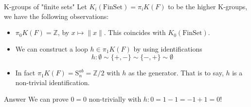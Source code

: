 \documentclass[12pt]{beamer}
\begin{document}
\begin{frame}{K-groups of "finite sets"}
  Let $ K_i(\mathrm{FinSet})= \pi_i K(F)$ to be the higher K-groups, we have the following observations:
  \pause
  \begin{itemize}
    \item $\pi_0 K(F) = \mathbb{Z}$, by $ x \mapsto \|x\|$. This coincides with $K_0(\mathrm{FinSet})$. 
      \pause
    \item We can construct a loop $h \in \pi_1 K(F) $ by using identifications 
      \[
        h: \emptyset \sim \{+,-\} \sim \{-,+\} \sim \emptyset
      \]
      \pause
    \item In fact $\pi_1 K(F)= \mathrm{S}_n^{ab}=\mathbb{Z}/2 $ with $h$ as the generator. That is to say, $h$ is a non-trivial identification. 
  \end{itemize}
  \pause
  \begin{block}{Answer}
    We can prove $0=0$ non-trivially with $h:0=1-1=-1+1=0$!
  \end{block}
\end{frame}
  
\end{document}
